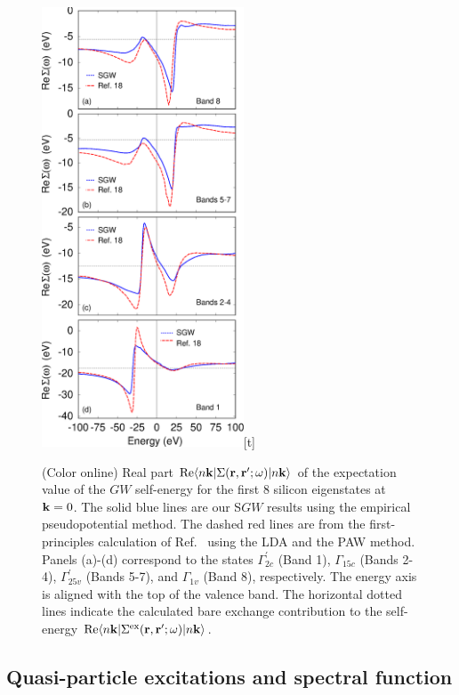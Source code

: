\documentclass[twocolumn,prb,showpacs,superscriptaddress]{revtex4}
\def\w{\omega}
\def\k{{\bf k}}
\def\r{{\bf r}}
\def\rp{{\bf r^\prime}}
\begin{document}
\begin  {figure}
\begin  {center}
\includegraphics[width=6cm]{fig4.eps}[t]
\end    {center}
\caption{\label{fig4}
        (Color online)
        Real part ${\rm Re} \langle n\k| \Sigma(\r,\rp;\w)|n\k\rangle$   of the expectation value of the $GW$ self-energy for the first
        8 silicon eigenstates at $\k=0$. The solid blue lines are our S$GW$ results using the empirical
        pseudopotential method. The dashed red lines are from the first-principles calculation of Ref.\ 
        using the LDA and the PAW method. Panels (a)-(d) correspond to the states
        $\Gamma^\prime_{2c}$ (Band 1), $\Gamma_{15c}$ (Bands 2-4), $\Gamma^\prime_{25v}$ (Bands 5-7),
        and $\Gamma_{1v}$ (Band 8), respectively. The energy axis is aligned with the top of the valence band.
        The horizontal dotted lines indicate the calculated bare exchange contribution to the self-energy ${\rm Re} \langle n\k| \Sigma^{\rm ex}(\r,\rp;\w)|n\k\rangle$.
        }
\end    {figure}

\subsection{Quasi-particle excitations and spectral function}\label{sec.5d}
\end{document}
